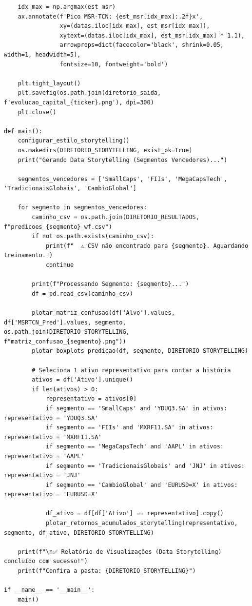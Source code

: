 \documentclass{article}
\begin{document}
\begin{verbatim}
    idx_max = np.argmax(est_msr)
    ax.annotate(f'Pico MSR-TCN: {est_msr[idx_max]:.2f}x', 
                xy=(datas.iloc[idx_max], est_msr[idx_max]),
                xytext=(datas.iloc[idx_max], est_msr[idx_max] * 1.1),
                arrowprops=dict(facecolor='black', shrink=0.05, width=1, headwidth=5),
                fontsize=10, fontweight='bold')

    plt.tight_layout()
    plt.savefig(os.path.join(diretorio_saida, f'evolucao_capital_{ticker}.png'), dpi=300)
    plt.close()

def main():
    configurar_estilo_storytelling()
    os.makedirs(DIRETORIO_STORYTELLING, exist_ok=True)
    print("Gerando Data Storytelling (Segmentos Vencedores)...")

    segmentos_vencedores = ['SmallCaps', 'FIIs', 'MegaCapsTech', 'TradicionaisGlobais', 'CambioGlobal']
    
    for segmento in segmentos_vencedores:
        caminho_csv = os.path.join(DIRETORIO_RESULTADOS, f"predicoes_{segmento}_wf.csv")
        if not os.path.exists(caminho_csv):
            print(f"  ⚠ CSV não encontrado para {segmento}. Aguardando treinamento.")
            continue
            
        print(f"Processando Segmento: {segmento}...")
        df = pd.read_csv(caminho_csv)
        
        plotar_matriz_confusao(df['Alvo'].values, df['MSRTCN_Pred'].values, segmento, os.path.join(DIRETORIO_STORYTELLING, f"matriz_confusao_{segmento}.png"))
        plotar_boxplots_predicao(df, segmento, DIRETORIO_STORYTELLING)
        
        # Seleciona 1 ativo representativo para contar a história
        ativos = df['Ativo'].unique()
        if len(ativos) > 0:
            representativo = ativos[0]
            if segmento == 'SmallCaps' and 'YDUQ3.SA' in ativos: representativo = 'YDUQ3.SA'
            if segmento == 'FIIs' and 'MXRF11.SA' in ativos: representativo = 'MXRF11.SA'
            if segmento == 'MegaCapsTech' and 'AAPL' in ativos: representativo = 'AAPL'
            if segmento == 'TradicionaisGlobais' and 'JNJ' in ativos: representativo = 'JNJ'
            if segmento == 'CambioGlobal' and 'EURUSD=X' in ativos: representativo = 'EURUSD=X'
            
            df_ativo = df[df['Ativo'] == representativo].copy()
            plotar_retornos_acumulados_storytelling(representativo, segmento, df_ativo, DIRETORIO_STORYTELLING)

    print(f"\n✅ Relatório de Visualizações (Data Storytelling) concluído com sucesso!")
    print(f"Confira a pasta: {DIRETORIO_STORYTELLING}")

if __name__ == '__main__':
    main()
\end{verbatim}

\newpage
\end{document}
